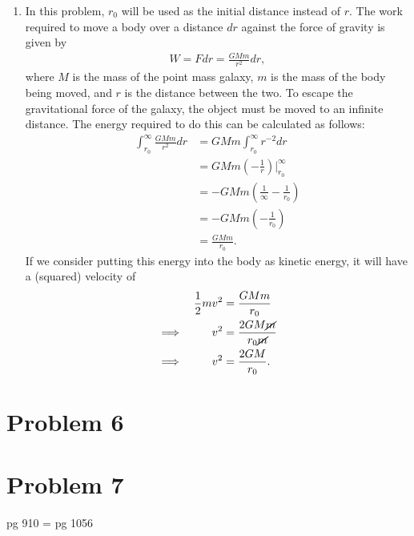 \documentclass[11pt,letterpaper]{article}
\begin{document}
\begin{enumerate}[label=(\alph*)]
    \item In this problem, $r_0$ will be used as the initial distance instead of $r$. The work required to move a body over a distance $dr$ against the force of gravity is given by 
        \begin{align*}
            W = Fdr = \frac{GMm}{r^2}dr,
        \end{align*}
        where $M$ is the mass of the point mass galaxy, $m$ is the mass of the body being moved, and $r$ is the distance between the two. To escape the gravitational force of the galaxy, the object must be moved to an infinite distance. The energy required to do this can be calculated as follows:
        \begin{align*}
            \int_{r_0}^{\infty} \frac{GMm}{r^2}dr &= GMm \int_{r_0}^{\infty} r^{-2}dr \\
            &= GMm\left(-\frac{1}{r}\right)\Big|_{r_0}^{\infty} \\
            &= -GMm\left(\frac{1}{\infty} - \frac{1}{r_0}\right) \\
            &= -GMm\left(-\frac{1}{r_0}\right) \\
            &= \frac{GMm}{r_0}.
        \end{align*}
        If we consider putting this energy into the body as kinetic energy, it will have a (squared) velocity of 
        \begin{alignat*}{2}
            &&\frac{1}{2}mv^2 &= \frac{GMm}{r_0} \\
            \implies&&v^2 &= \frac{2GM\cancel{m}}{r_0\cancel{m}} \\
            \implies&&v^2 &= \frac{2GM}{r_0}.
        \end{alignat*}
\end{enumerate}

\section*{Problem 6} 

\begin{enumerate}[label=(\alph*)]
\end{enumerate}

\section*{Problem 7} 
pg 910 = pg 1056
\begin{enumerate}[label=(\alph*)]
\end{enumerate}
\end{document}
